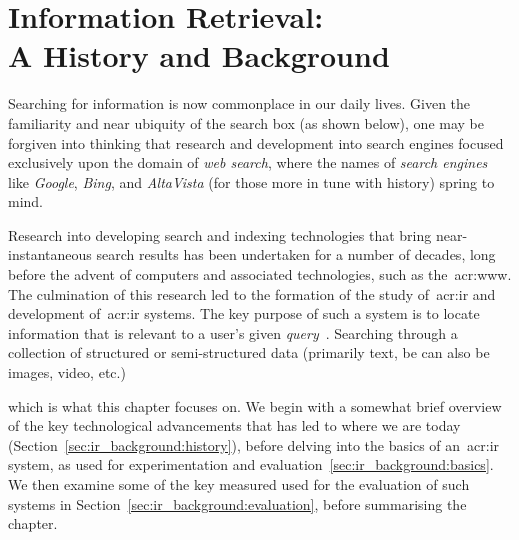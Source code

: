 
\chapter[Information Retrieval]{Information Retrieval:\\A History and Background}\label{chap:ir_background}
Searching for information is now commonplace in our daily lives. Given the familiarity and near ubiquity of the search box (as shown below), one may be forgiven into thinking that research and development into search engines focused exclusively upon the domain of \emph{web search}, where the names of \emph{search engines} like \emph{Google}, \emph{Bing}, and \emph{AltaVista} (for those more in tune with history) spring to mind.

\begin{figure}[h]
    \centering
    \vspace{5mm}
    \label{fig:searchbox}
    \vspace{-5mm}
\end{figure}

Research into developing search and indexing technologies that bring near-instantaneous search results has been undertaken for a number of decades, long before the advent of computers and associated technologies, such as the~\gls{acr:www}. The culmination of this research led to the formation of the study of~\gls{acr:ir} and development of~\gls{acr:ir} systems. The key purpose of such a system is to locate information that is relevant to a user's given \emph{query}~\cite{sanderson2012history_of_ir}. Searching through a collection of structured or semi-structured data (primarily text, be can also be images, video, etc.)


which is what this chapter focuses on. We begin with a somewhat brief overview of the key technological advancements that has led to where we are today (Section~\ref{sec:ir_background:history}), before delving into the basics of an~\gls{acr:ir} system, as used for experimentation and evaluation~\ref{sec:ir_background:basics}. We then examine some of the key measured used for the evaluation of such systems in Section~\ref{sec:ir_background:evaluation}, before summarising the chapter.


